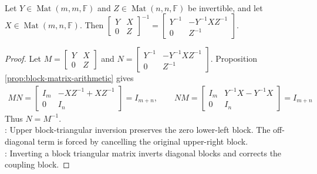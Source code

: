 \begin{proposition} \label{prop:block-upper-triangular-inverse} \\
Let $Y\in\operatorname{Mat}(m,m,\mathbb{F})$ and $Z\in\operatorname{Mat}(n,n,\mathbb{F})$ be invertible, and let $X\in\operatorname{Mat}(m,n,\mathbb{F})$. Then $\begin{bmatrix}
Y & X\\
0 & Z
\end{bmatrix}^{-1}
=
\begin{bmatrix}
Y^{-1} & -Y^{-1}XZ^{-1}\\
0 & Z^{-1}
\end{bmatrix}$.
\begin{proof}
Let $M=\begin{bmatrix}Y&X\\0&Z\end{bmatrix}$ and $N=\begin{bmatrix}Y^{-1}&-Y^{-1}XZ^{-1}\\0&Z^{-1}\end{bmatrix}$. Proposition \ref{prop:block-matrix-arithmetic} gives
\begin{align}
MN=
\begin{bmatrix}
I_m&-XZ^{-1}+XZ^{-1}\\
0&I_n
\end{bmatrix}
=I_{m+n},
\qquad
NM=
\begin{bmatrix}
I_m&Y^{-1}X-Y^{-1}X\\
0&I_n
\end{bmatrix}
=I_{m+n} \nonumber
\end{align}
Thus $N=M^{-1}$.\\
: Upper block-triangular inversion preserves the zero lower-left block. The off-diagonal term is forced by cancelling the original upper-right block.\\
: Inverting a block triangular matrix inverts diagonal blocks and corrects the coupling block.
\end{proof}
\end{proposition}

